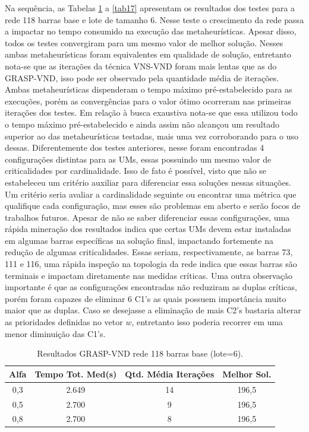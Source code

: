 \documentclass[12pt]{article}
\begin{document}
Na sequência, as Tabelas \ref{tab14} a \ref{tab17} apresentam os resultados dos testes para a rede 118 barras base e lote de tamanho 6. Nesse teste o crescimento da rede passa a impactar no tempo consumido na execução das metaheurísticas. Apesar disso, todos os testes convergiram para um mesmo valor de melhor solução. Nesses ambas metaheurísticas foram equivalentes em qualidade de solução, entretanto nota-se que as iterações da técnica VNS-VND foram mais lentas que as do GRASP-VND, isso pode ser observado pela quantidade média de iterações. Ambas metaheurísticas dispenderam o tempo máximo pré-estabelecido para as execuções, porém as convergências para o valor ótimo ocorreram nas primeiras iterações dos testes. Em relação à busca exaustiva nota-se que essa utilizou todo o tempo máximo pré-estabelecido e ainda assim não alcançou um resultado superior ao das metaheurísticas testadas, mais uma vez corroborando para o uso dessas. Diferentemente dos testes anteriores, nesse foram encontradas 4 configurações distintas para as UMs, essas possuindo um mesmo valor de criticalidades por cardinalidade. Isso de fato é possível, visto que não se estabeleceu um critério auxiliar para diferenciar essa soluções nessas situações. Um critério seria avaliar a cardinalidade seguinte ou encontrar uma métrica que qualifique cada configuração, mas esses são problemas em aberto e serão focos de trabalhos futuros. Apesar de não se saber diferenciar essas configurações, uma rápida mineração dos resultados indica que certas UMs devem estar instaladas em algumas barras específicas na solução final, impactando fortemente na redução de algumas criticalidades. Essas seriam, respectivamente, as barras 73, 111 e 116, uma rápida inspeção na topologia da rede indica que essas barras são terminais e impactam diretamente nas medidas críticas. Uma outra observação importante é que as configurações encontradas não reduziram as duplas críticas, porém foram capazes de eliminar 6 C1's as quais possuem importância muito maior que as duplas. Caso se desejasse a eliminação de mais C2's bastaria alterar as prioridades definidas no vetor $w$, entretanto isso poderia recorrer em uma menor diminuição das C1's.
\begin{table}[H]
	\centering
	\caption{Resultados GRASP-VND rede 118 barras base (lote=6).}
	\begin{tabular}{|c|c|c|c|}
		\hline
		\textbf{Alfa} & \textbf{Tempo Tot. Med(s)} & \textbf{Qtd. Média Iterações} & \textbf{Melhor Sol.} \\
		\hline
		0,3   & 2.649 & 14    & 196,5 \\
		\hline
		0,5   & 2.700 & 9     & 196,5 \\
		\hline
		0,8   & 2.700 & 8     & 196,5 \\
		\hline
	\end{tabular}%
	\label{tab14}%
\end{table}%
\end{document}
